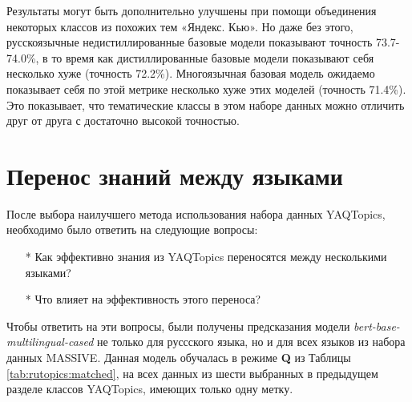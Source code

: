 \begin{table*}
\centering
\caption{Точность (Макро-F1) различных базовых моделей для 5-кратной кросс-валидации на всех классах из наборе данных {YAQTopics} при обучении только на вопросах.
 Базовые модели обозначаются как в Таблице~\ref{tab:rutopics:backbones}. Дисперсия не превосходит 0.65 для всех базовых моделей.}
\end{table*}

Результаты могут быть дополнительно улучшены при помощи объединения некоторых классов из похожих тем «Яндекс. Кью». Но даже без этого, русскоязычные недистиллированные базовые модели  показывают точность 73.7-74.0\%, в то время как дистиллированные базовые модели показывают себя несколько хуже (точность 72.2\%). Многоязычная базовая модель ожидаемо показывает себя по этой метрике несколько хуже этих моделей (точность 71.4\%). Это показывает, что тематические классы в этом наборе данных можно отличить друг от друга с достаточно высокой точностью.

\section{Перенос знаний между языками}
После выбора наилучшего метода использования набора данных {YAQTopics}, необходимо было ответить на следующие вопросы:
\begin{itemize}
\item[*]Как эффективно знания из {YAQTopics} переносятся между несколькими языками?
\item[*]Что влияет на эффективность этого переноса?
\end{itemize}
Чтобы ответить на эти вопросы, были получены предсказания модели \textit{bert-base-multilingual-cased} не только для руссского языка, но и для всех языков из набора данных {MASSIVE}. Данная модель обучалась в режиме \textbf{Q} из Таблицы \ref{tab:rutopics:matched}, на всех данных из шести выбранных в предыдущем разделе классов {YAQTopics}, имеющих только одну метку.

